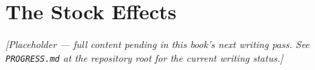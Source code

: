 \chapter{The Stock Effects}
\label{ch:stock-effects}

\emph{[Placeholder --- full content pending in this book's next writing pass. See \texttt{PROGRESS.md} at the repository root for the current writing status.]}
